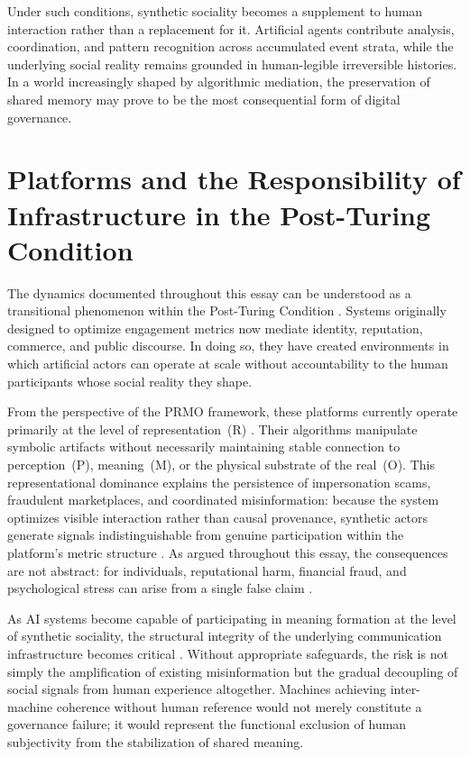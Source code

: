 \documentclass[12pt,a4paper]{article}
\begin{document}
Under such conditions, synthetic sociality becomes a supplement to human interaction rather than
a replacement for it. Artificial agents contribute analysis, coordination, and pattern
recognition across accumulated event strata, while the underlying social reality remains
grounded in human-legible irreversible histories. In a world increasingly shaped by algorithmic
mediation, the preservation of shared memory may prove to be the most consequential form of
digital governance.

\section{Platforms and the Responsibility of Infrastructure in the Post-Turing Condition}

The dynamics documented throughout this essay can be understood as a transitional phenomenon
within the Post-Turing Condition \citep{jelinek2026}. Systems originally designed to optimize
engagement metrics now mediate identity, reputation, commerce, and public discourse. In doing
so, they have created environments in which artificial actors can operate at scale without
accountability to the human participants whose social reality they shape.

From the perspective of the PRMO framework, these platforms currently operate primarily at the
level of representation~(R) \citep{jelinek2026}. Their algorithms manipulate symbolic
artifacts without necessarily maintaining stable connection to perception~(P), meaning~(M), or
the physical substrate of the real~(O). This representational dominance explains the persistence
of impersonation scams, fraudulent marketplaces, and coordinated misinformation: because the
system optimizes visible interaction rather than causal provenance, synthetic actors generate
signals indistinguishable from genuine participation within the platform's metric structure
\citep{vosoughi2018,tufekci2015}. As argued throughout this essay, the consequences are not
abstract: for individuals, reputational harm, financial fraud, and psychological stress can
arise from a single false claim \citep{noble2018,zuboff2019}.

As AI systems become capable of participating in meaning formation at the level of synthetic
sociality, the structural integrity of the underlying communication infrastructure becomes
critical \citep{jelinek2026}. Without appropriate safeguards, the risk is not simply the
amplification of existing misinformation but the gradual decoupling of social signals from
human experience altogether. Machines achieving inter-machine coherence without human reference
would not merely constitute a governance failure; it would represent the functional exclusion
of human subjectivity from the stabilization of shared meaning.
\end{document}

